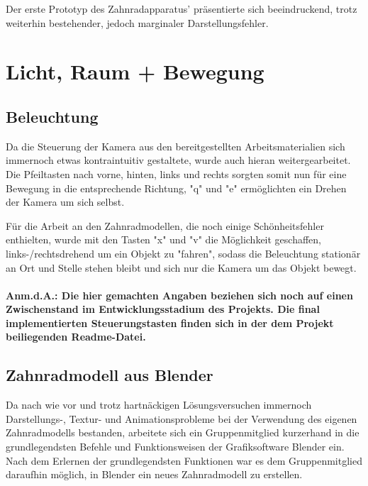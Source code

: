 \documentclass{article}
\begin{document}
Der erste Prototyp des Zahnradapparatus' präsentierte sich beeindruckend, trotz weiterhin bestehender, jedoch marginaler Darstellungsfehler. 





\section{Licht, Raum + Bewegung}



\subsection{Beleuchtung}
Da die Steuerung der Kamera aus den bereitgestellten Arbeitsmaterialien sich immernoch  etwas kontraintuitiv gestaltete, wurde auch hieran weitergearbeitet. 
Die Pfeiltasten nach vorne, hinten, links und rechts sorgten somit nun für eine Bewegung in die entsprechende Richtung, "q" und "e" ermöglichten ein Drehen der Kamera um sich selbst. 

Für die Arbeit an den Zahnradmodellen, die noch einige Schönheitsfehler enthielten, wurde mit den Tasten "x" und "v" die Möglichkeit geschaffen, links-/rechtsdrehend um ein Objekt zu "fahren", sodass die Beleuchtung stationär an Ort und Stelle stehen bleibt und sich nur die Kamera um das Objekt bewegt. 

\paragraph{Anm.d.A.: 
Die hier gemachten Angaben beziehen sich noch auf einen Zwischenstand im Entwicklungsstadium des Projekts. 
Die final implementierten Steuerungstasten finden sich in der dem Projekt beiliegenden Readme-Datei. 
}



\subsection{Zahnradmodell aus Blender}
Da nach wie vor und trotz hartnäckigen Lösungsversuchen immernoch Darstellungs-, Textur- und Animationsprobleme bei der Verwendung des eigenen Zahnradmodells bestanden, arbeitete sich ein Gruppenmitglied kurzerhand in die grundlegendsten Befehle und Funktionsweisen der Grafiksoftware Blender ein. 
Nach dem Erlernen der grundlegendsten Funktionen war es dem Gruppenmitglied daraufhin möglich, in Blender ein neues Zahnradmodell zu erstellen. 
\end{document}
